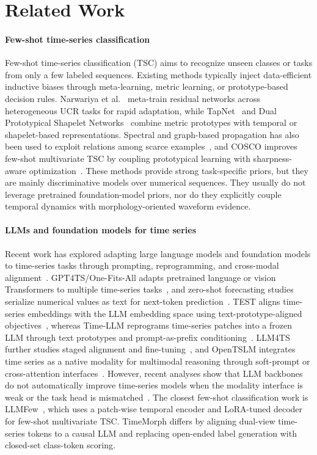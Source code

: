 \documentclass[10pt,journal,compsoc]{IEEEtran}
\begin{document}
\section{Related Work}
\paragraph{Few-shot time-series classification}
Few-shot time-series classification (TSC) aims to recognize unseen classes or tasks from only a few labeled sequences.
Existing methods typically inject data-efficient inductive biases through meta-learning, metric learning, or prototype-based decision rules.
Narwariya et al.~\cite{narwariya2020meta} meta-train residual networks across heterogeneous UCR tasks for rapid adaptation, while TapNet~\cite{tapnet} and Dual Prototypical Shapelet Networks~\cite{tang2020interpretable} combine metric prototypes with temporal or shapelet-based representations.
Spectral and graph-based propagation has also been used to exploit relations among scarce examples~\cite{yang2022spectral}, and COSCO improves few-shot multivariate TSC by coupling prototypical learning with sharpness-aware optimization~\cite{barreda2024cosco}.
These methods provide strong task-specific priors, but they are mainly discriminative models over numerical sequences.
They usually do not leverage pretrained foundation-model priors, nor do they explicitly couple temporal dynamics with morphology-oriented waveform evidence.

\paragraph{LLMs and foundation models for time series}
Recent work has explored adapting large language models and foundation models to time-series tasks through prompting, reprogramming, and cross-modal alignment~\cite{zhang2024large,jiang2024empowering,shi2025large}. GPT4TS/One-Fits-All adapts pretrained language or vision Transformers to multiple time-series tasks~\cite{zhou2023onefitsall}, and zero-shot forecasting studies serialize numerical values as text for next-token prediction~\cite{gruver2023large}.
TEST aligns time-series embeddings with the LLM embedding space using text-prototype-aligned objectives~\cite{sun2023test}, whereas Time-LLM reprograms time-series patches into a frozen LLM through text prototypes and prompt-as-prefix conditioning~\cite{jin2024timellm}.
LLM4TS further studies staged alignment and fine-tuning~\cite{chang2025llm4ts}, and OpenTSLM integrates time series as a native modality for multimodal reasoning through soft-prompt or cross-attention interfaces~\cite{langer2025opentslm}.
However, recent analyses show that LLM backbones do not automatically improve time-series models when the modality interface is weak or the task head is mismatched~\cite{tan2024language,zheng2024revisited,zheng2025understanding}.
The closest few-shot classification work is LLMFew~\cite{chen2025llmfew}, which uses a patch-wise temporal encoder and LoRA-tuned decoder for few-shot multivariate TSC.
TimeMorph differs by aligning dual-view time-series tokens to a causal LLM and replacing open-ended label generation with closed-set class-token scoring.
\end{document}
